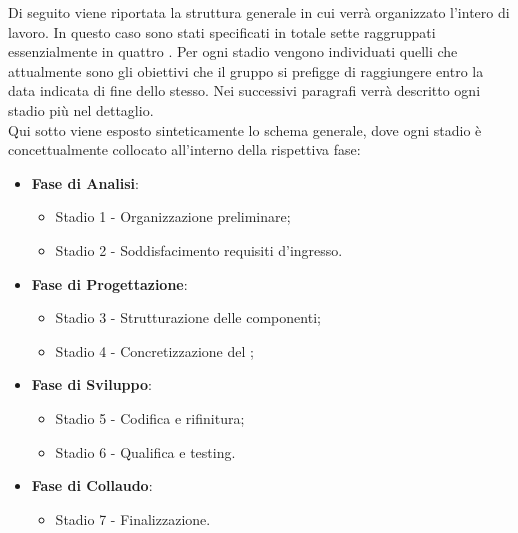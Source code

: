 Di seguito viene riportata la struttura generale in cui verrà organizzato l'intero  di lavoro. In questo caso sono stati specificati in totale sette  raggruppati essenzialmente in quattro . Per ogni stadio vengono individuati quelli che attualmente sono gli obiettivi che il gruppo \Gruppo{} si prefigge di raggiungere entro la data indicata di fine dello stesso. Nei successivi paragrafi verrà descritto ogni stadio più nel dettaglio.\\
Qui sotto viene esposto sinteticamente lo schema generale, dove ogni stadio è concettualmente collocato all'interno della rispettiva fase:

\begin{itemize}
    \item \textbf{Fase di Analisi}:
    \begin{itemize}
        \item Stadio 1 - Organizzazione preliminare;
        \item Stadio 2 - Soddisfacimento requisiti d'ingresso.
    \end{itemize}

    \item \textbf{Fase di Progettazione}:
    \begin{itemize}
        \item Stadio 3 - Strutturazione delle componenti;
        \item Stadio 4 - Concretizzazione del ;
    \end{itemize}

    \item \textbf{Fase di Sviluppo}:
    \begin{itemize}  
        \item Stadio 5 - Codifica e rifinitura;
        \item Stadio 6 - Qualifica e testing.
    \end{itemize}

    \item \textbf{Fase di Collaudo}:
    \begin{itemize}        
        \item Stadio 7 - Finalizzazione.
    \end{itemize}
\end{itemize}

